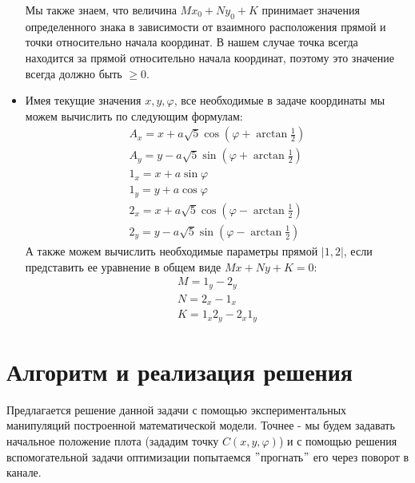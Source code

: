 \documentclass[12pt,a4paper]{article}
\begin{document}
\begin{itemize}
				Мы также знаем, что величина $Mx_0 + Ny_0 + K$ принимает значения определенного знака в зависимости от взаимного расположения прямой и точки относительно начала координат. В нашем случае точка всегда находится за прямой относительно начала координат, поэтому это значение всегда должно быть $\geqslant 0$.
				\item Имея текущие значения $x, y, \varphi$, все необходимые в задаче координаты мы можем вычислить по следующим формулам:
				\begin{equation}\label{eq:formulas}
					\begin{array}{ll}
						A_x = x + a\sqrt{5}\cos(\varphi + \arctan{\frac{1}{2}})\\
						A_y = y - a\sqrt{5}\sin(\varphi + \arctan{\frac{1}{2}})\\
						1_x = x + a\sin\varphi\\
						1_y = y + a\cos\varphi\\
						2_x = x + a\sqrt{5}\cos(\varphi - \arctan{\frac{1}{2}})\\
						2_y = y - a\sqrt{5}\sin(\varphi - \arctan{\frac{1}{2}})
					\end{array}
				\end{equation}
				А также можем вычислить необходимые параметры прямой $|1, 2|$, если представить ее уравнение в общем виде $Mx + Ny + K = 0$:
				\begin{equation}
					\begin{array}{ll}
						M = 1_y - 2_y\\
						N = 2_x - 1_x\\
						K = 1_x 2_y - 2_x 1_y
					\end{array}
				\end{equation}
			\end{itemize}
		
	\section{Алгоритм и реализация решения}
		Предлагается решение данной задачи с помощью экспериментальных манипуляций построенной математической модели. Точнее - мы будем задавать начальное положение плота (зададим точку $C(x,y,\varphi)$) и с помощью решения вспомогательной задачи оптимизации попытаемся $"$прогнать$"$ его через поворот в канале.\\
		
\end{document}
